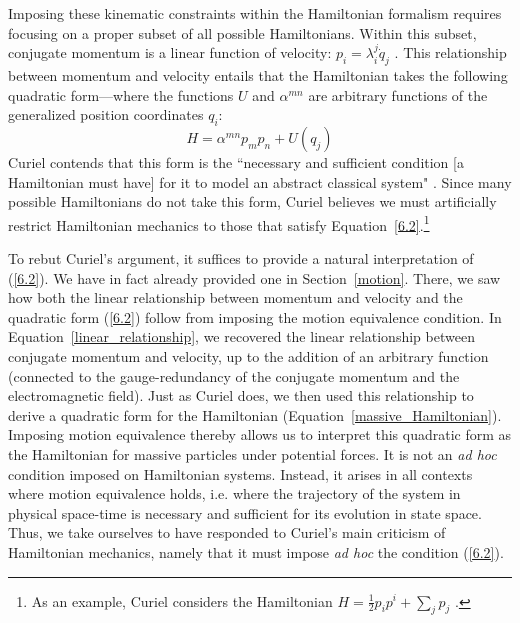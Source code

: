 \documentclass[letterpaper]{article}
\begin{document}
Imposing these kinematic constraints within the Hamiltonian formalism requires focusing on a proper subset of all possible Hamiltonians. Within this subset, conjugate momentum is a linear function of velocity: $p_i = \lambda^j_i \dot{q}_j $ \parencites*[304]{Curiel}. This relationship between momentum and velocity entails that the Hamiltonian takes the following quadratic form---where the functions $U$ and $\alpha^{m n}$ are arbitrary functions of the generalized position coordinates $q_i$:
\begin{equation} \label{6.2}
H =\alpha^{m n} p_m p_n + U (q_j) 
\end{equation}
Curiel contends that this form is the ``necessary and sufficient condition [a Hamiltonian must have] for it to model an abstract classical system" \parencites*[305]{Curiel}. Since many possible Hamiltonians do not take this form, Curiel believes we must artificially restrict Hamiltonian mechanics to those that satisfy Equation~\ref{6.2}.\footnote{As an example, Curiel considers the Hamiltonian $H = \frac{1}{2} p_i p^i + \sum_j p_j$  \parencites*[305]{Curiel}.}

To rebut Curiel's argument, it suffices to provide a natural interpretation of (\ref{6.2}). We have in fact already provided one in Section~\ref{motion}. There, we saw how both the linear relationship between momentum and velocity and the quadratic form (\ref{6.2}) follow from imposing the motion equivalence condition. In Equation~\ref{linear_relationship}, we recovered the linear relationship between conjugate momentum and velocity, up to the addition of an arbitrary function (connected to the gauge-redundancy of the conjugate momentum and the electromagnetic field). Just as Curiel does, we then used this relationship to derive a quadratic form for the Hamiltonian (Equation~\ref{massive_Hamiltonian}). Imposing motion equivalence thereby allows us to interpret this quadratic form as the Hamiltonian for massive particles under potential forces. It is not an \textit{ad hoc} condition imposed on Hamiltonian systems. Instead, it arises in all contexts where motion equivalence holds, i.e. where the trajectory of the system in physical space-time is necessary and sufficient for its evolution in state space. Thus, we take ourselves to have responded to Curiel's main criticism of Hamiltonian mechanics, namely that it must impose \textit{ad hoc} the condition (\ref{6.2}). 
\end{document}
